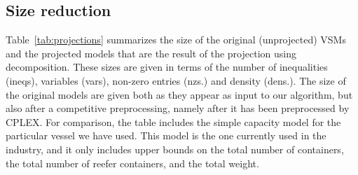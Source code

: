 \subsection{Size reduction}
Table~\ref{tab:projections} summarizes the size of the original (unprojected) VSMs and the projected models that are the result of the projection using decomposition. These sizes are given in terms of the number of inequalities (ineqs), variables (vars), non-zero entries (nzs.) and density (dens.). The size of the original models are given both as they appear as input to our algorithm, but also after a {competitive} preprocessing, namely after it has been preprocessed by CPLEX. For comparison, the table includes the simple capacity model for the particular vessel we have used. This model is the one currently used in the industry, and it only includes upper bounds on the total number of containers, the total number of reefer containers, and the total weight.  

